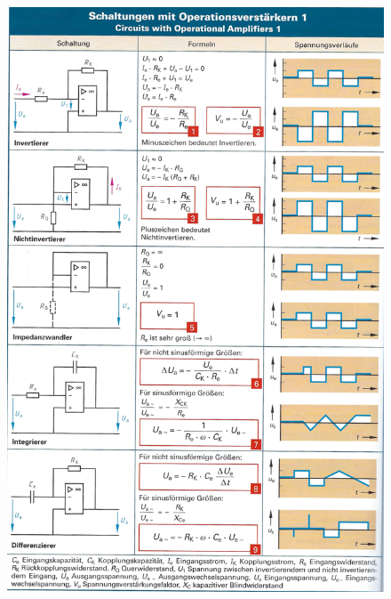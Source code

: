 \documentclass[a5paper, 12pt, twoside]{scrartcl}
\begin{document}
\begin{figure}[H]
  \centering
  \includegraphics[width=.93\textwidth]{OPV1}
\end{figure}
\end{document}
